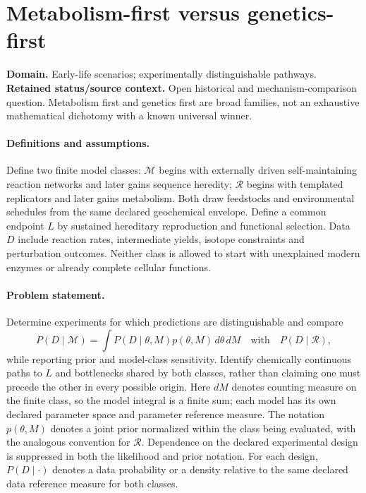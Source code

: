 \documentclass[11pt]{article}
\begin{document}
\section*{Metabolism-first versus genetics-first}
\label{prob:291}
\label{rank:48}
\par\smallskip

\noindent\textbf{Domain.} Early-life scenarios; experimentally distinguishable pathways. \quad \textbf{Retained status/source context.} Open historical and mechanism-comparison question. Metabolism first and genetics first are broad families, not an exhaustive mathematical dichotomy with a known universal winner.

\paragraph{Definitions and assumptions.} Define two finite model classes: $\mathcal M$ begins with externally driven self-maintaining reaction networks and later gains sequence heredity; $\mathcal R$ begins with templated replicators and later gains metabolism. Both draw feedstocks and environmental schedules from the same declared geochemical envelope. Define a common endpoint $L$ by sustained hereditary reproduction and functional selection. Data $D$ include reaction rates, intermediate yields, isotope constraints and perturbation outcomes. Neither class is allowed to start with unexplained modern enzymes or already complete cellular functions.

\paragraph{Problem statement.} Determine experiments for which predictions are distinguishable and compare
\[
P(D\mid\mathcal M)=\int P(D\mid\theta,M)p(\theta,M)\,d\theta\,dM
\quad\text{with}\quad P(D\mid\mathcal R),
\]
while reporting prior and model-class sensitivity. Identify chemically continuous paths to $L$ and bottlenecks shared by both classes, rather than claiming one must precede the other in every possible origin. Here $dM$ denotes counting measure on the finite class, so the model integral is a finite sum; each model has its own declared parameter space and parameter reference measure. The notation $p(\theta,M)$ denotes a joint prior normalized within the class being evaluated, with the analogous convention for $\mathcal R$. Dependence on the declared experimental design is suppressed in both the likelihood and prior notation. For each design, $P(D\mid\cdot)$ denotes a data probability or a density relative to the same declared data reference measure for both classes.
\end{document}
